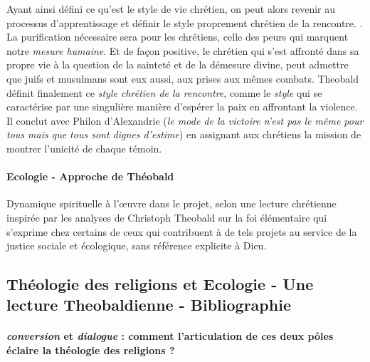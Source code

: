  
Ayant ainsi défini ce qu'est le style de vie chrétien, on peut alors revenir au processus d'apprentissage et définir le {style proprement chrétien de la rencontre.} . La purification nécessaire sera pour les chrétiens, celle des peurs qui marquent notre \textit{mesure humaine}. Et de façon positive, le chrétien qui s'est affronté dans sa propre vie à la question de la sainteté et de la démesure divine, peut admettre que juifs et musulmans sont eux aussi, aux prises aux mêmes combats. Theobald définit finalement ce \textit{style chrétien de la rencontre}, comme le \textit{style} qui se caractérise par une singulière manière d'espérer la paix en affrontant la violence. Il conclut avec Philon d'Alexandrie (\textit{le mode de la victoire n'est pas le même pour tous mais que tous sont dignes d'estime}) en assignant aux chrétiens la mission de montrer l'unicité de chaque témoin. 



\paragraph{Ecologie - Approche de Théobald } Dynamique spirituelle à l’œuvre dans le projet, selon une lecture chrétienne inspirée par les analyses de Christoph Theobald sur la foi élémentaire qui s’exprime chez certains de ceux qui contribuent à de tels projets au service de la justice sociale et écologique, sans référence explicite à Dieu.      
\cite{de_benaze_conversion_2020}








\subsection{Théologie des religions et Ecologie - Une lecture Theobaldienne - Bibliographie}

\paragraph{\textit{conversion} et \textit{dialogue} : comment l'articulation de ces deux pôles éclaire la théologie des religions ?}
 \cite{lasida_parler_2020} \cite{campos_laudato_2017} \cite{puglisi_religious_2020}



